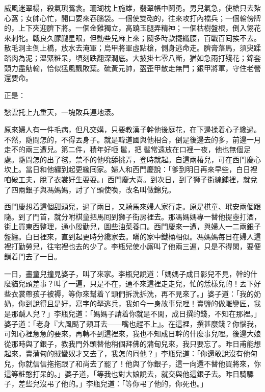 \begin{myquote}
威風迷翠榻，殺氣瑣鴛衾。珊瑚枕上施雄，翡翠帳中鬬勇。男兒氣急，使槍只去紮心窩；女帥心忙，開口要來吞腦袋。一個使雙砲的，往來攻打內襠兵；一個輪傍牌的，上下夾迎臍下將。一個金雞獨立，高蹺玉腿弄精神；一個枯樹盤根，倒入翎花來刺牝。戰良久朦朧星眼，但動些兒麻上來；鬬多時款擺纖腰，百戰百囘挨不去。散毛洞主倒上橋，放水去淹軍；烏甲將軍虛點槍，側身逃命走。臍膏落馬，須臾蹂踏肉為泥；溫緊粧呆，頃刻跌翻深澗底。大披掛七零八斷，猶如急雨打殘花；錦套頭力盡觔輸，恰似猛風飄敗葉。硫黃元帥，盔歪甲散走無門；銀甲將軍，守住老營還要命。
\end{myquote}

正是：

\begin{myquote}
愁雲托上九重天，一塊敗兵連地滾。
\end{myquote}

原來婦人有一件毛病，{}但凡交媾，只要教漢子幹他後庭花，在下邊揉着心子纔過。不然，隨問怎的，不得丟身子。就是韓道國與他相合，倒是後邊去的多，前邊一月走不的兩三遭兒。第二件，積年好咂𩫻䯲，把𩫻䯲常遠放在口裡一夜，他也無個足處。隨問怎的出了毧，禁不的他吮舔挑弄，登時就起。自這兩樁兒，可在西門慶心坎上。當日和他纏到起更纔囘家。婦人和西門慶說：「爹到明日再來早些，白日裡咱破工夫，脫了衣裳好生耍耍。」西門慶大喜。到次日，到了獅子街線鋪裡，就兌了四兩銀子與馮媽媽，討了丫頭使喚，改名叫做錦兒。

西門慶想着這個甜頭兒，過了兩日，又騎馬來婦人家行走。原是棋童、玳安兩個跟隨。到了門首，就分咐棋童把馬囘到獅子街房裡去。那馮媽媽專一替他提壺打酒，街上買東西整理，通小殷勤兒，圖些油菜養口。西門慶來一遭，與婦人一二兩銀子盤纏。白日裡來，直到起更時分纔家去。瞞的家中鐵桶相似。馮媽媽每日在婦人這裡打勤勞兒，往宅裡也去的少了。李瓶兒使小厮叫了他兩三遍，只是不得閑，要便鎖着門去了一日。

一日，畫童兒撞見婆子，叫了來家。李瓶兒說道：「媽媽子成日影兒不見，幹的什麼貓兒頭差事？叫了一遍，只是不在，通不來這裡走走兒，忙的恁樣兒的！丟下好些衣裳帶孩子被褥，等你來幫着丫頭們拆洗拆洗，再不見來了。」婆子道：「我的奶奶，你到說得且是好，寫字的拏逃兵，我如今一身故事兒哩！賣鹽的做雕鑾匠，我是那鹹人兒？」{}李瓶兒道：「媽媽子請着你就是不閑，成日撰的錢，不知在那裡。」婆子道：「老身『大風颳了頰耳去——嘴也趕不上』。在這裡，撰甚麼錢？你惱我，可知心裡急急的要來，再轉不到這裡來，我也不知成日幹的什麼事兒哩。後邊大娘從那時與了銀子，教我門外頭替他稍個拜佛的蒲甸兒來，我只要忘了。昨日甫能想起來，賣蒲甸的賊蠻奴才又去了，我怎的囘他？」李瓶兒道：「你還敢說沒有他甸兒，你就信信拖拖跟了和尚去了罷了！他與了你銀子，這一向還不替他買將來，你這等粧憨打呆的。」婆子道，「等我也對大娘說去，就交與他這銀子去。昨日騎騾子，差些兒沒弔了他的。」李瓶兒道：「等你弔了他的，你死也。」


